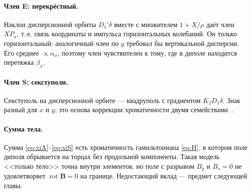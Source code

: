 \paragraph{Член E: перекрёстный.}
Наклон дисперсионной орбиты $D_1'\delta$ вместе с множителем $1+X/\rho$ даёт член $XP_x$, т.\,е. связь координаты и импульса горизонтальных колебаний. Он только горизонтальный: аналогичный член по $y$ требовал бы вертикальной дисперсии. Его среднее $\propto\alpha_x$, поэтому член чувствителен к тому, где в диполе находится перетяжка $\beta_x$.

\paragraph{Член S: секступоли.}
Секступоль на дисперсионной орбите --- квадруполь с градиентом $K_2D_1\delta$. Знак разный для $x$ и $y$; это основа коррекции хроматичности двумя семействами~\cite{ValetovPhD}.

\paragraph{Сумма тела.}
Сумма \eqref{eq:xiA}--\eqref{eq:xiS} есть хроматичность гамильтониана \eqref{eq:H}, в котором поле диполя обрывается на торцах без продольной компоненты. Такая модель <<только тело>> точна внутри элементов, но поле с разрывом $B_y$ и $B_s=0$ не удовлетворяет $\operatorname{rot}\mathbf{B}=0$ на границе. Недостающий вклад --- предмет следующей главы.
